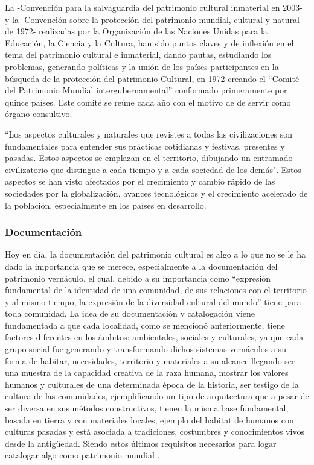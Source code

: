 La -Convención para la salvaguardia del patrimonio cultural inmaterial en 2003-\citep{UNESCO2003} y la -Convención sobre la protección del patrimonio mundial, cultural y natural de 1972- realizadas por la Organización de las Naciones Unidas para la Educación, la Ciencia y la Cultura, han sido puntos claves y de inflexión en el tema del patrimonio cultural e inmaterial, dando pautas, estudiando los problemas, generando políticas y la unión de los países participantes en la búsqueda de la protección del patrimonio Cultural, en 1972 creando el ``Comité del Patrimonio Mundial intergubernamental'' conformado primeramente por quince países. Este comité se reúne cada año con el motivo de de servir como órgano consultivo.

``Los aspectos culturales y naturales que revistes a todas las civilizaciones son fundamentales para entender sus prácticas cotidianas y festivas, presentes y pasadas. Estos aspectos se emplazan en el territorio, dibujando un entramado civilizatorio que distingue a cada tiempo y a cada sociedad de los demás"\citep{rodriguezestudio}. Estos aspectos se han visto afectados por el crecimiento y cambio rápido de las sociedades por la globalización, avances tecnológicos y el crecimiento acelerado de la población, especialmente en los países en desarrollo.

\subsubsection{Documentación}
Hoy en día, la documentación del patrimonio cultural es algo a lo que no se le ha dado la importancia que se merece, especialmente a la documentación del patrimonio vernáculo, el cual, debido a su importancia como ``expresión fundamental de la identidad de una comunidad, de sus relaciones con el territorio y al mismo tiempo, la expresión de la diversidad cultural del mundo''\citep{icomos1999carta} tiene para toda comunidad. La idea de su documentación y catalogación viene fundamentada a que cada localidad, como se mencionó anteriormente, tiene factores diferentes en los ámbitos: ambientales, sociales y culturales, ya que cada grupo social fue generando y transformando dichos sistemas vernáculos a su forma de habitar, necesidades, territorio y materiales a su alcance llegando ser una muestra de la capacidad creativa de la raza humana, mostrar los valores humanos y culturales de una determinada época de la historia, ser testigo de la cultura de las comunidades, ejemplificando un tipo de arquitectura que a pesar de ser diversa en sus métodos constructivos, tienen la misma base fundamental, basada en tierra y con materiales locales, ejemplo del habitat de humanos con culturas pasadas y está asociada a tradiciones, costumbres y conocimientos vivos desde la antigüedad. Siendo estos últimos requisitos necesarios para logar catalogar algo como patrimonio mundial \citep{WEB_requisitos_patrimonio_mundial}.

